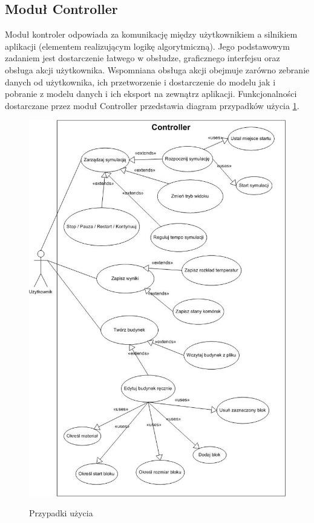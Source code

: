 \subsection{Moduł Controller}
Moduł kontroler odpowiada za komunikację między użytkownikiem a silnikiem aplikacji (elementem realizującym logikę algorytmiczną). 
Jego podstawowym zadaniem jest dostarczenie łatwego w obsłudze, graficznego interfejsu oraz 
obsługa akcji użytkownika. Wspomniana obsługa akcji obejmuje zarówno zebranie danych od użytkownika, ich przetworzenie
i dostarczenie do modelu jak i pobranie z modelu danych i ich eksport na zewnątrz aplikacji.
Funkcjonalności dostarczane przez moduł Controller przedstawia diagram przypadków użycia \ref{przypadki uzycia}.
\begin{figure}
\begin {center}
\includegraphics{useCase.jpg} \\
\caption { Przypadki użycia}
\label {przypadki uzycia}
\end {center}
\end{figure}


